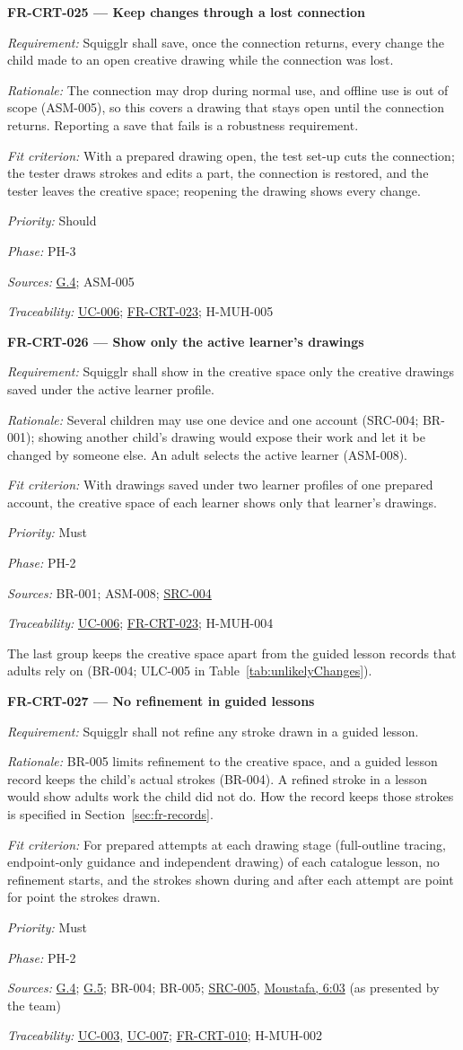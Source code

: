 \documentclass[12pt]{article}
\renewcommand{\_}{\textunderscore\allowbreak}%
\newcommand{\intlink}[3]{\hyperref[int:#1-#2]{#3}}
\newcommand{\intref}[2]{\intlink{#1}{#2}{#1, #2}}
\newcommand{\goalref}[1]{\hyperref[goal:#1]{G.#1}}
\newcommand{\ucref}[1]{\hyperref[uc:#1]{\mbox{UC-#1}}}
\newenvironment{srsrequirement}[2]{%
  \par\medskip\noindent\phantomsection\label{req:#1}%
  \textbf{#1 --- #2}\par\nobreak\smallskip }{\par\medskip}
\newcommand{\reqfield}[2]{\noindent\textit{#1:} #2\par}
\newcommand{\reqshall}[1]{\reqfield{Requirement}{#1}}
\newcommand{\reqrationale}[1]{\reqfield{Rationale}{#1}}
\newcommand{\reqfit}[1]{\reqfield{Fit criterion}{#1}}
\newcommand{\reqpriority}[1]{\reqfield{Priority}{#1}}
\newcommand{\reqphase}[1]{\reqfield{Phase}{#1}}
\newcommand{\reqsources}[1]{\reqfield{Sources}{#1}}
\newcommand{\reqtraces}[1]{\reqfield{Traceability}{#1}}
\newcommand{\reqref}[1]{\hyperref[req:#1]{#1}}
\newcommand{\srcref}[1]{\hyperref[src:#1]{SRC-#1}}
\providecommand{\ucref}[1]{\hyperref[uc:#1]{UC-#1}}
\begin{document}
\begin{srsrequirement}{FR-CRT-025}{Keep changes through a lost connection}
  \reqshall{Squigglr shall save, once the connection returns, every change the
child made to an open creative drawing while the connection was lost.}
\reqrationale{The connection may drop during normal use, and offline use is out
of scope (ASM-005), so this covers a drawing that stays open until the
connection returns. Reporting a save that fails is a robustness requirement.}
\reqfit{With a prepared drawing open, the test set-up cuts the connection; the
tester draws strokes and edits a part, the connection is restored, and the
tester leaves the creative space; reopening the drawing shows every change.}
  \reqpriority{Should}
  \reqphase{PH-3}
  \reqsources{\goalref{4}; ASM-005} \reqtraces{\ucref{006}; \reqref{FR-CRT-023};
  H-MUH-005}
\end{srsrequirement}

\begin{srsrequirement}{FR-CRT-026}{Show only the active learner's drawings}
  \reqshall{Squigglr shall show in the creative space only the creative drawings
saved under the active learner profile.} \reqrationale{Several children may use
one device and one account (SRC-004; BR-001); showing another child's drawing
would expose their work and let it be changed by someone else. An adult selects
the active learner (ASM-008).} \reqfit{With drawings saved under two learner
profiles of one prepared account, the creative space of each learner shows only
that learner's drawings.}
  \reqpriority{Must}
  \reqphase{PH-2}
  \reqsources{BR-001; ASM-008; \srcref{004}} \reqtraces{\ucref{006};
  \reqref{FR-CRT-023}; H-MUH-004}
\end{srsrequirement}

The last group keeps the creative space apart from the guided lesson records
that adults rely on (BR-004; ULC-005 in Table~\ref{tab:unlikelyChanges}).

\begin{srsrequirement}{FR-CRT-027}{No refinement in guided lessons}
  \reqshall{Squigglr shall not refine any stroke drawn in a guided lesson.}
  \reqrationale{BR-005 limits refinement to the creative space, and a guided
lesson record keeps the child's actual strokes (BR-004). A refined stroke in a
lesson would show adults work the child did not do. How the record keeps those
strokes is specified in Section~\ref{sec:fr-records}.} \reqfit{For prepared
attempts at each drawing stage (full-outline tracing, endpoint-only guidance and
independent drawing) of each catalogue lesson, no refinement starts, and the
strokes shown during and after each attempt are point for point the strokes
drawn.}
  \reqpriority{Must}
  \reqphase{PH-2}
  \reqsources{\goalref{4}; \goalref{5}; BR-004; BR-005; \srcref{005},
\intref{Moustafa}{6:03} (as presented by the team)} \reqtraces{\ucref{003},
\ucref{007}; \reqref{FR-CRT-010}; H-MUH-002}
\end{srsrequirement}
\end{document}
